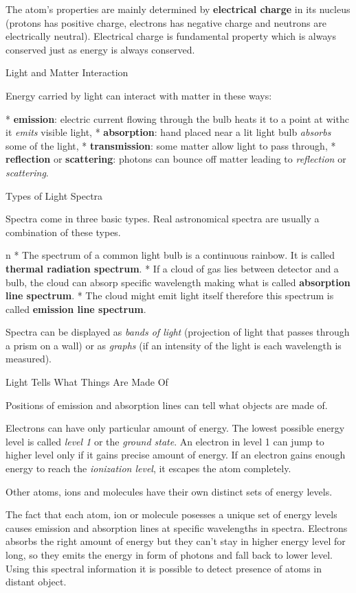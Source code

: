 The atom's properties are mainly determined by {\bf electrical charge} in its
nucleus (protons has positive charge, electrons has negative charge
and neutrons are electrically neutral). Electrical charge is fundamental
property which is always conserved just as energy is always conserved.

\sec Light and Matter Interaction

Energy carried by light can interact with matter in these ways:

\begitems
* {\bf emission}: electric current flowing through the bulb heats it to a point
at withc it {\em emits} visible light,
* {\bf absorption}: hand placed near a lit light bulb {\em absorbs} some
of the light,
* {\bf transmission}: some matter allow light to pass through,
* {\bf reflection} or {\bf scattering}: photons can bounce off matter leading to
{\em reflection} or {\em scattering}.
\enditems

\sec Types of Light Spectra

Spectra come in three basic types. Real astronomical spectra are usually
a combination of these types.

\begitems \style n
* The spectrum of a common light bulb is a continuous rainbow. It is called
{\bf thermal radiation spectrum}.
* If a cloud of gas lies between detector and a bulb, the cloud can absorp
specific wavelength making what is called {\bf absorption line spectrum}.
* The cloud might emit light itself therefore this spectrum is called
{\bf emission line spectrum}.
\enditems

Spectra can be displayed as {\em bands of light} (projection of light that
passes through a prism on a wall) or as {\em graphs} (if an intensity
of the light is each wavelength is measured).

\sec Light Tells What Things Are Made Of

Positions of emission and absorption lines can tell what objects are made of.

Electrons can have only particular amount of energy. The lowest possible energy
level is called {\em level 1} or the {\em ground state}. An electron in level 1
can jump to higher level only if it gains precise amount of energy. If
an electron gains enough energy to reach the {\em ionization level}, it escapes
the atom completely.

Other atoms, ions and molecules have their own distinct sets of energy levels.

The fact that each atom, ion or molecule posesses a unique set of energy levels
causes emission and absorption lines at specific wavelengths in spectra.
Electrons absorbs the right amount of energy but they can't stay in higher
energy level for long, so they emits the energy in form of photons and fall
back to lower level. Using this spectral information it is possible to detect
presence of atoms in distant object.

